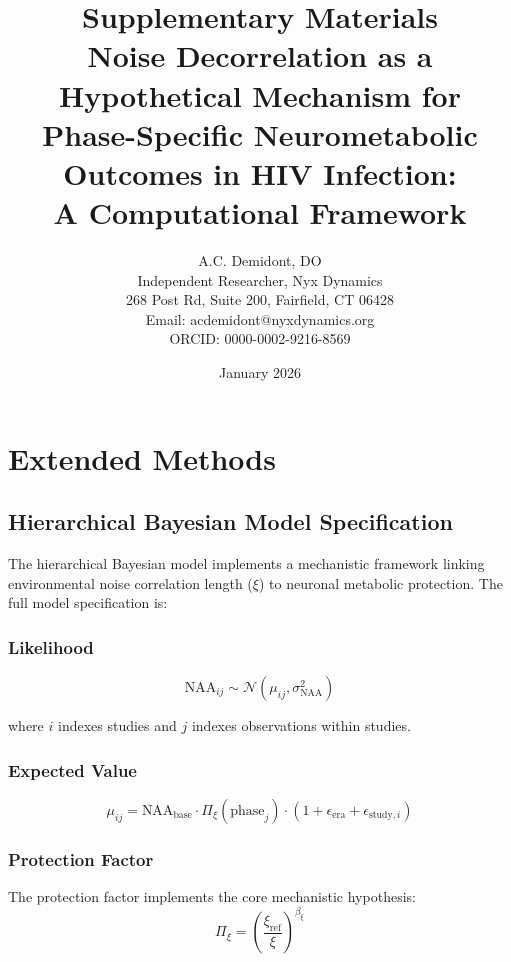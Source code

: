 \documentclass[11pt]{article}
\title{\textbf{Supplementary Materials}\\[0.5em]
\large Noise Decorrelation as a Hypothetical Mechanism for\\Phase-Specific Neurometabolic Outcomes in HIV Infection:\\A Computational Framework}
\author{A.C. Demidont, DO\\
Independent Researcher, Nyx Dynamics\\
268 Post Rd, Suite 200, Fairfield, CT 06428\\
Email: acdemidont@nyxdynamics.org\\
ORCID: 0000-0002-9216-8569}
\date{January 2026}
\begin{document}
\maketitle
\tableofcontents
\newpage

\section{Extended Methods}
\label{sec:extended_methods}

\subsection{Hierarchical Bayesian Model Specification}

The hierarchical Bayesian model implements a mechanistic framework linking environmental noise correlation length ($\xi$) to neuronal metabolic protection. The full model specification is:

\subsubsection{Likelihood}
\begin{equation}
\text{NAA}_{ij} \sim \mathcal{N}(\mu_{ij}, \sigma_\text{NAA}^2)
\end{equation}

where $i$ indexes studies and $j$ indexes observations within studies.

\subsubsection{Expected Value}
\begin{equation}
\mu_{ij} = \text{NAA}_\text{base} \cdot \Pi_\xi(\text{phase}_j) \cdot (1 + \epsilon_{\text{era}} + \epsilon_{\text{study},i})
\end{equation}

\subsubsection{Protection Factor}
The protection factor implements the core mechanistic hypothesis:
\begin{equation}
\Pi_\xi = \left(\frac{\xi_\text{ref}}{\xi}\right)^{\beta_\xi}
\end{equation}
\end{document}
